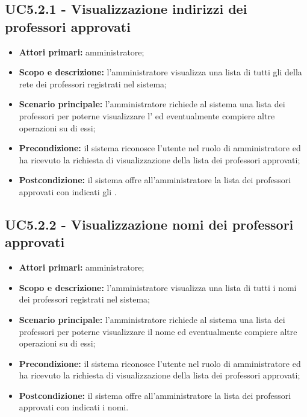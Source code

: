 \documentclass[AnalisiDeiRequisiti.tex]{subfiles}
\begin{document}
\subsection{UC5.2.1 - Visualizzazione indirizzi dei professori approvati}
\begin{itemize}
	\item \textbf{Attori primari:} amministratore;
	\item \textbf{Scopo e descrizione:} l'amministratore visualizza una lista di tutti gli  della rete  dei professori registrati nel sistema;
	\item \textbf{Scenario principale:} l'amministratore richiede al sistema una lista dei professori per poterne visualizzare l' ed eventualmente compiere altre operazioni su di essi;
	\item \textbf{Precondizione:} il sistema riconosce l'utente nel ruolo di amministratore ed ha ricevuto la richiesta di visualizzazione della lista dei professori approvati;
	\item \textbf{Postcondizione:} il sistema offre all'amministratore la lista dei professori approvati con indicati gli .
\end{itemize}
\subsection{UC5.2.2 - Visualizzazione nomi dei professori approvati}
\begin{itemize}
	\item \textbf{Attori primari:} amministratore;
	\item \textbf{Scopo e descrizione:} l'amministratore visualizza una lista di tutti i nomi dei professori registrati nel sistema;
	\item \textbf{Scenario principale:} l'amministratore richiede al sistema una lista dei professori per poterne visualizzare il nome ed eventualmente compiere altre operazioni su di essi;
	\item \textbf{Precondizione:} il sistema riconosce l'utente nel ruolo di amministratore ed ha ricevuto la richiesta di visualizzazione della lista dei professori approvati;
	\item \textbf{Postcondizione:} il sistema offre all'amministratore la lista dei professori approvati con indicati i nomi.
\end{itemize}
\end{document}
